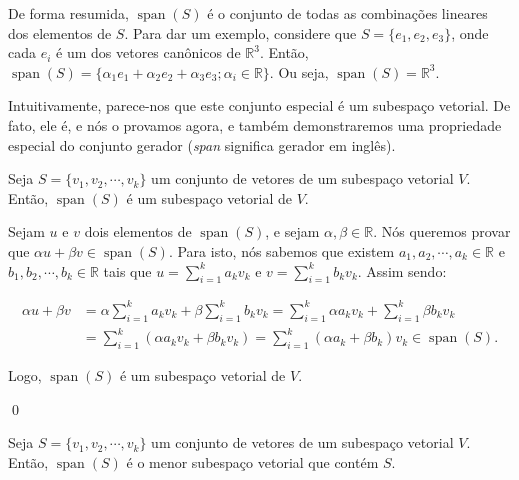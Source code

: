 De forma resumida, $\operatorname{span}(S)$ é o conjunto de todas as combinações lineares dos elementos de $S$. Para dar um exemplo, considere que $S = \{e_1, e_2, e_3\}$, onde cada $e_i$ é um dos vetores canônicos de $\mathbb{R}^3$. Então, $\operatorname{span}(S) = \{\alpha_1e_1 + \alpha_2e_2 + \alpha_3e_3; \alpha_i\in\mathbb{R}\}$. Ou seja, $\operatorname{span}(S) = \mathbb{R}^3$.

Intuitivamente, parece-nos que este conjunto especial é um subespaço vetorial. De fato, ele é, e nós o provamos agora, e também demonstraremos uma propriedade especial do conjunto gerador (\textit{span} significa gerador em inglês).

\begin{Proposition}
	Seja $S = \{v_1, v_2, \cdots, v_k\}$ um conjunto de vetores de um subespaço vetorial $V$. Então, $\operatorname{span}(S)$ é um subespaço vetorial de $V$.
\end{Proposition}

\begin{Proof}
	Sejam $u$ e $v$ dois elementos de $\operatorname{span}(S)$, e sejam $\alpha, \beta\in\mathbb{R}$. Nós queremos provar que $\alpha u + \beta v\in\operatorname{span}(S)$. Para isto, nós sabemos que existem $a_1, a_2, \cdots, a_k\in\mathbb{R}$ e $b_1, b_2, \cdots, b_k\in\mathbb{R}$ tais que $u = \sum\limits_{i = 1}^{k} a_kv_k$ e $v = \sum\limits_{i = 1}^{k} b_kv_k$. Assim sendo:
	
	\begin{align*}
		\alpha u + \beta v &= \alpha\sum\limits_{i = 1}^{k} a_kv_k + \beta\sum\limits_{i = 1}^{k} b_kv_k = \sum\limits_{i = 1}^{k} \alpha a_kv_k + \sum\limits_{i = 1}^{k} \beta b_kv_k \\ &= \sum\limits_{i = 1}^{k} (\alpha a_kv_k + \beta b_kv_k) = \sum\limits_{i = 1}^{k} (\alpha a_k + \beta b_k)v_k\in\operatorname{span}(S).
	\end{align*}
 	
 	Logo, $\operatorname{span}(S)$ é um subespaço vetorial de $V$.
 	
 	\qed
\end{Proof}

\begin{Proposition}
	Seja $S = \{v_1, v_2, \cdots, v_k\}$ um conjunto de vetores de um subespaço vetorial $V$. Então, $\operatorname{span}(S)$ é o menor subespaço vetorial que contém $S$.
\end{Proposition}

